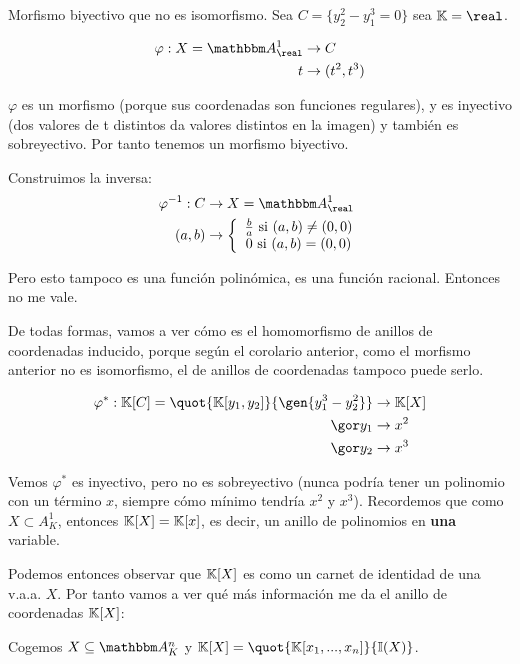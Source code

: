 \begin{example}
	Morfismo biyectivo que no es isomorfismo. Sea $C=\{y_2^2-y_1^3=0\}$ sea $\K=\real$.

	\begin{align*}
		\varphi: X=\A^1_ {\real} & \rightarrow C \\
		t & \rightarrow (t^2, t^3)
	\end{align*}

	$\varphi$ es un morfismo (porque sus coordenadas son funciones regulares), y es inyectivo (dos valores de t distintos da valores distintos en la imagen) y también es sobreyectivo. Por tanto tenemos un morfismo biyectivo.

	Construimos la inversa:
	\begin{align*}
		\varphi^{-1}: C & \rightarrow X=\A_{\real}^1 \\
		(a,b) & \rightarrow \left\{ \begin{array}{c}
			\frac{b}{a} \text{ si } (a,b)\neq(0,0)\\
			 0 \text{ si } (a,b)=(0,0)
		\end{array}\right.
	\end{align*}

	Pero esto tampoco es una función polinómica, es una función racional. Entonces no me vale.

	De todas formas, vamos a ver cómo es el homomorfismo de anillos de coordenadas inducido, porque según el corolario anterior, como el morfismo anterior no es isomorfismo, el de anillos de coordenadas tampoco puede serlo.

	\begin{align*}
		\varphi^*: \K[C]= \quot{\K[y_1,y_2]}{\gen{y_1^3-y_2^2}} & \rightarrow \K[X] \\
		\cls{y_1} & \rightarrow x^2 \\
		\cls{y_2} & \rightarrow x^3
	\end{align*}

	Vemos $\varphi^*$ es inyectivo, pero no es sobreyectivo (nunca podría tener un polinomio con un término $x$, siempre cómo mínimo tendría $x^2$ y $x^3$). Recordemos que como $X \subset A_K^1$, entonces $\mathbb{K}[X]=\mathbb{K}[x]$, es decir, un anillo de polinomios en \textbf{una} variable.
\end{example}

Podemos entonces observar que $\mathbb{K}[X]$ es como un carnet de identidad de una v.a.a. $X$. Por tanto vamos a ver qué más información me da el anillo de coordenadas $\mathbb{K}[X]$:

Cogemos $X \subseteq \Akn$ y $\K[X]= \quot{\K[x_1,...,x_n]}{\I(X)}$.

